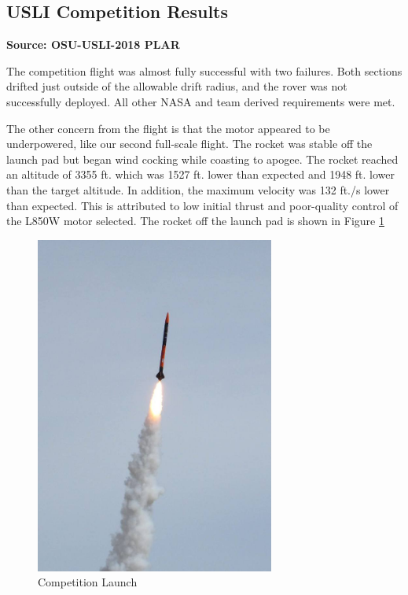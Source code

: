 \documentclass[onecolumn, draftclsnofoot, 10pt, compsoc]{IEEEtran}
\begin{document}
\subsection{USLI Competition Results}
\textbf{Source: OSU-USLI-2018 PLAR}\par
The competition flight was almost fully successful with two failures.  Both sections drifted just outside of the allowable drift radius, and the rover was not successfully deployed.  All other NASA and team derived requirements were met.

The other concern from the flight is that the motor appeared to be underpowered, like our second full-scale flight. The rocket was stable off the launch pad but began wind cocking while coasting to apogee. The rocket reached an altitude of 3355 ft. which was 1527 ft. lower than expected and 1948 ft. lower than the target altitude. In addition, the maximum velocity was 132 ft./s lower than expected.  This is attributed to low initial thrust and poor-quality control of the L850W  motor selected. The rocket off the launch pad is shown in Figure \ref{figure: Comp Launch}

\begin{figure}[H]
	\centering
	\includegraphics[width=0.7\textwidth]{competitionlaunch_1024.jpg}
	\caption{Competition Launch}
    \label{figure: Comp Launch}
\end{figure}
\end{document}
